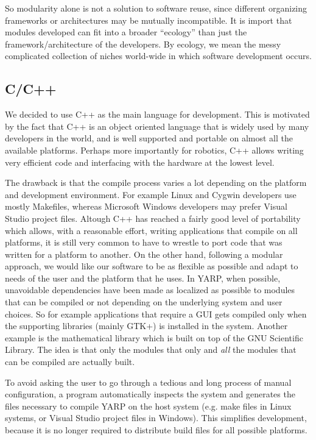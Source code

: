 So modularity alone is not a solution to software reuse, since 
different organizing frameworks or architectures may be mutually
incompatible.  It is import that modules developed can fit
into a broader ``ecology'' than just the framework/architecture
of the developers.  By ecology, we mean the messy complicated
collection of niches world-wide in which software development occurs.






\subsection{C/C++}

We decided to use C++ as the main language for development. This 
is motivated by the fact that C++ is an object oriented language
that is widely used by many developers in the world, and is well 
supported and portable on almost all the available platforms. 
Perhaps more importantly for robotics, C++ allows writing very 
efficient code and interfacing with the hardware at the lowest 
level.

The drawback is that the compile process varies a lot depending 
on the platform and development environment. For example Linux 
and Cygwin developers use mostly Makefiles, whereas Microsoft Windows 
developers may prefer Visual Studio project files. 
Altough C++ has reached a fairly good level 
of portability which allows, with a reasonable effort, writing 
applications that compile on all platforms, it is still very 
common to have to wrestle to port code that was written for 
a platform to another. On the other hand, following a 
modular approach, we would like our software to be as flexible 
as possible and adapt to needs of the user and the platform that 
he uses. In YARP, when possible, unavoidable dependencies 
have been made as localized as possible to modules that can be 
compiled or not depending on the underlying system and user 
choices. So for example applications that require a GUI gets 
compiled only when the supporting libraries (mainly GTK+) 
is installed in the system. Another example is the mathematical
library which is built on top of the GNU Scientific Library. 
The idea is that only the modules that only and \emph{all} the 
modules that can be compiled are actually built.

To avoid asking the user to go through a tedious and long process 
of manual configuration, a program automatically inspects the 
system and generates the files necessary to compile YARP 
on the host system (e.g. make files in Linux systems, or Visual 
Studio project files in Windows). This simplifies development, 
because it is no longer required to distribute build files 
for all possible platforms.

